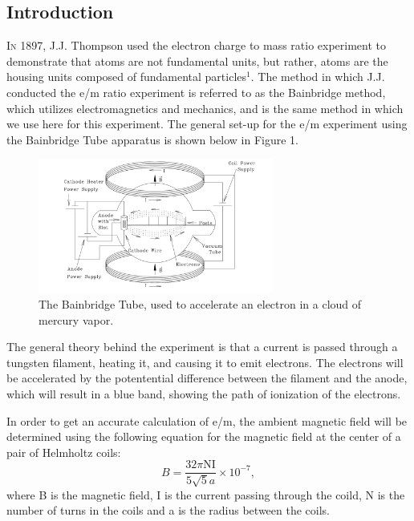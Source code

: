 \documentclass[twoside,10pt]{article}
\begin{document}
	\begin{multicols}{2} %
		
		\section{Introduction} 
		
		\lettrine[nindent=0em,lines=2]{I}n 1897, J.J. Thompson used the electron charge to mass ratio experiment to demonstrate that atoms are not fundamental units, but rather, atoms are the housing units composed of fundamental particles$^1$. The method in which J.J. conducted the e/m ratio experiment is referred to as the Bainbridge method, which utilizes electromagnetics and mechanics, and is the same method in which we use here for this experiment. The general set-up for the e/m experiment using the Bainbridge Tube apparatus is shown below in Figure 1. 
		
		\begin{figure}[H]
			\centering
			\includegraphics[width=77mm]{helmholtz coil.png}
			\caption{The Bainbridge Tube, used to accelerate an electron in a cloud of mercury vapor.}
		\end{figure}
		
		The general theory behind the experiment is that a current is passed through a tungsten filament, heating it, and causing it to emit electrons. The electrons will be accelerated by the potentential difference between the filament and the anode, which will result in a blue band, showing the path of ionization of the electrons. 
		
		In order to get an accurate calculation of e/m, the ambient magnetic field will be determined using the following equation for the magnetic field at the center of a pair of Helmholtz coils:
		\begin{equation}
			B = \frac{32 \pi \text{N} \text{I}}{5 \sqrt{5} a} \times 10^{-7},
		\end{equation}
		where B is the magnetic field, I is the current passing through the coild, N is the number of turns in the coils and a is the radius between the coils.
		

\end{multicols}
\end{document}
